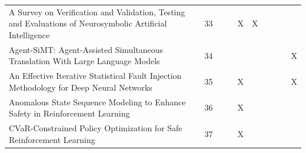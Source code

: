 \begin{landscape}
\begin{longtable}{|p{14cm}|c|c|c|c|c|c|c|c|c|}
		A Survey on Verification and Validation, Testing and Evaluations of Neurosymbolic Artificial Intelligence                                               & 33          &                                    &                                                           & X                                                     & X                                                          &                                           &                                              &                                                    &                                    \\
		Agent-SiMT: Agent-Assisted Simultaneous Translation With Large Language Models                                                                          & 34          &                                    &                                                           &                                                       &                                                            &                                           &                                              &                                                    & X                                  \\
		An Effective Iterative Statistical Fault Injection Methodology for Deep Neural Networks                                                                 & 35          &                                    &                                                           & X                                                     &                                                            &                                           &                                              &                                                    & X                                  \\
		Anomalous State Sequence Modeling to Enhance Safety in Reinforcement Learning                                                                           & 36          &                                    &                                                           & X                                                     &                                                            &                                           &                                              &                                                    &                                    \\
		CVaR-Constrained Policy Optimization for Safe Reinforcement Learning                                                                                    & 37          &                                    &                                                           & X                                                     &                                                            &                                           &                                              &                                                    &                                    \\

\end{longtable}
\end{landscape}
